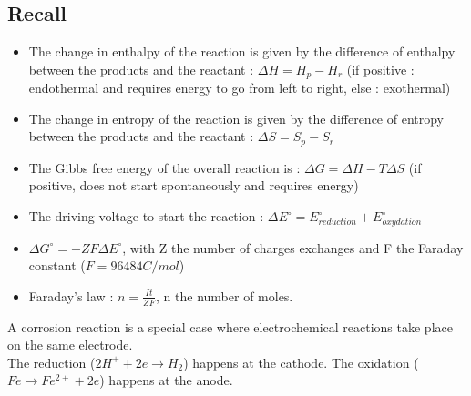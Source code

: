 \documentclass[../main.tex]{subfiles}
\begin{document}
\localtableofcontents

\subsection{Recall}
\begin{itemize}
    \item The change in enthalpy of the reaction is given by the difference of enthalpy between the products and the reactant : $\Delta H = H_p - H_r$ (if positive : endothermal and requires energy to go from left to right, else : exothermal)\\
    \item The change in entropy of the reaction is given by the difference of entropy between the products and the reactant : $\Delta S = S_p - S_r$\\
    \item The Gibbs free energy of the overall reaction is : $\Delta G = \Delta H - T \Delta S$ (if positive, does not start spontaneously and requires energy)\\
    \item The driving voltage to start the reaction : $\Delta E^\circ = E_{reduction}^\circ + E_{oxydation}^\circ$\\
    \item $\Delta G^\circ = -ZF \Delta E^\circ$, with Z the number of charges exchanges and F the Faraday constant ($F = 96484 C/mol$)\\
    \item Faraday's law : $n = \frac{It}{ZF}$, n the number of moles.\\
\end{itemize}

\warning A corrosion reaction is a special case where electrochemical reactions take place on the same electrode.\\
The reduction ($2H^+ + 2e \rightarrow H_2$) happens at the cathode. The oxidation ($Fe \rightarrow Fe^{2+} + 2e$) happens at the anode.\\
\end{document}
